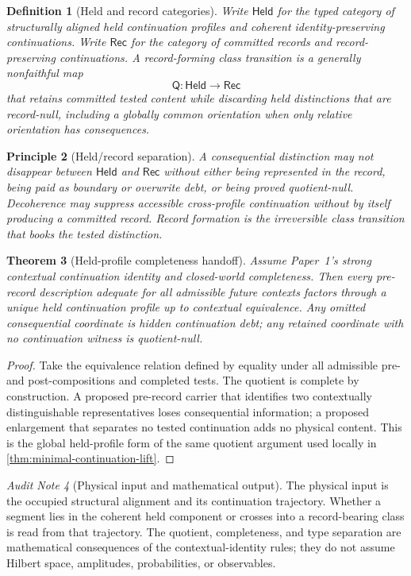 \documentclass[11pt]{article}
\newtheorem{theorem}{Theorem}[section]
\newtheorem{definition}[theorem]{Definition}
\newtheorem{principle}[theorem]{Principle}
\theoremstyle{remark}
\newtheorem{audit}[theorem]{Audit Note}
\newcommand{\Held}{\mathsf{Held}}
\newcommand{\Rec}{\mathsf{Rec}}
\begin{document}
\begin{definition}[Held and record categories]
Write \(\Held\) for the typed category of structurally aligned held continuation profiles and coherent identity-preserving continuations.  Write \(\Rec\) for the category of committed records and record-preserving continuations.  A record-forming class transition is a generally nonfaithful map
\[
        \mathsf Q:\Held\longrightarrow\Rec
\]
that retains committed tested content while discarding held distinctions that are record-null, including a globally common orientation when only relative orientation has consequences.
\end{definition}

\begin{principle}[Held/record separation]
A consequential distinction may not disappear between \(\Held\) and \(\Rec\) without either being represented in the record, being paid as boundary or overwrite debt, or being proved quotient-null.  Decoherence may suppress accessible cross-profile continuation without by itself producing a committed record.  Record formation is the irreversible class transition that books the tested distinction.
\end{principle}

\begin{theorem}[Held-profile completeness handoff]\label{thm:held-completeness}
Assume Paper~1's strong contextual continuation identity and closed-world completeness.  Then every pre-record description adequate for all admissible future contexts factors through a unique held continuation profile up to contextual equivalence.  Any omitted consequential coordinate is hidden continuation debt; any retained coordinate with no continuation witness is quotient-null.
\end{theorem}

\begin{proof}
Take the equivalence relation defined by equality under all admissible pre- and post-compositions and completed tests.  The quotient is complete by construction.  A proposed pre-record carrier that identifies two contextually distinguishable representatives loses consequential information; a proposed enlargement that separates no tested continuation adds no physical content.  This is the global held-profile form of the same quotient argument used locally in \cref{thm:minimal-continuation-lift}.
\end{proof}

\begin{audit}[Physical input and mathematical output]
The physical input is the occupied structural alignment and its continuation trajectory.  Whether a segment lies in the coherent held component or crosses into a record-bearing class is read from that trajectory.  The quotient, completeness, and type separation are mathematical consequences of the contextual-identity rules; they do not assume Hilbert space, amplitudes, probabilities, or observables.
\end{audit}
\end{document}
